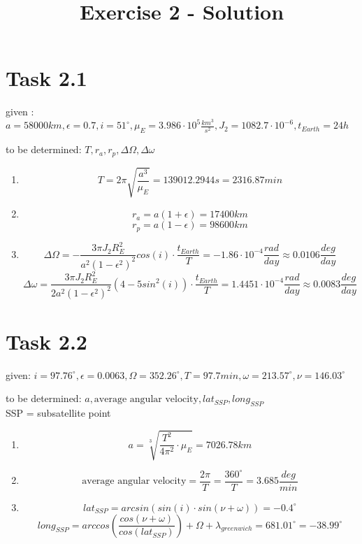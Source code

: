 \documentclass[a4paper,12pt]{article}
\title{Exercise 2 - Solution}
\author{}
\date{}
\begin{document}
\maketitle

\section*{Task 2.1}

given : $a = 58000km,\epsilon = 0.7, i = 51^{\circ}, \mu_E = 3.986\cdot 10^5 \frac{km^3}{s^2}, J_2 = 1082.7 \cdot 10^{-6}, t_{Earth} = 24h$

\noindent to be determined: $T, r_a, r_p, \Delta\Omega, \Delta\omega$
\begin{enumerate}
 \item \[ T = 2\pi\sqrt{\frac{a^3}{\mu_E}} = 139012.2944s = 2316.87 min\]
 \item \[ r_a = a(1+\epsilon) = 17400km\]
 \[r_p = a(1-\epsilon) = 98600km\]
 \item \[\Delta\Omega = - \frac{3\pi J_2R_E^2}{a^2(1-\epsilon^2)^2}cos(i)\cdot \frac{t_{Earth}}{T} = -1.86\cdot 10^{-4} \frac{rad}{day} \approx 0.0106 \frac{deg}{day}\]
 \[\Delta\omega = \frac{3\pi J_2R_E^2}{2a^2(1-\epsilon^2)^2}(4-5sin^2(i))\cdot \frac{t_{Earth}}{T} = 1.4451 \cdot 10^{-4}\frac{rad}{day} \approx 0.0083 \frac{deg}{day}\]
\end{enumerate}


\section*{Task 2.2}
given: $i = 97.76^{\circ}, \epsilon = 0.0063, \Omega = 352.26^{\circ}, T = 97.7min, \omega = 213.57^{\circ}, \nu = 146.03^{\circ}$

\noindent to be determined: $a, \text{average angular velocity}, lat_{SSP}, long_{SSP}$
\\SSP = subsatellite point
\begin{enumerate}
 \item \[ a = \sqrt[3]{\frac{T^2}{4\pi^2}\cdot \mu_E} = 7026.78 km\]
 \item \[ \text{average angular velocity} = \frac{2\pi}{T} = \frac{360^{\circ}}{T} = 3.685 \frac{deg}{min}\]
 \item \[ lat_{SSP} = arcsin\left(sin(i)\cdot sin(\nu+\omega)\right) = -0.4^{\circ} \]
 \[long_{SSP} = arccos\left(\frac{cos(\nu+\omega)}{cos(lat_{SSP})}\right) + \Omega + \lambda_{greenwich}= 681.01^{\circ} = -38.99^{\circ}\]
\end{enumerate}
\end{document}
